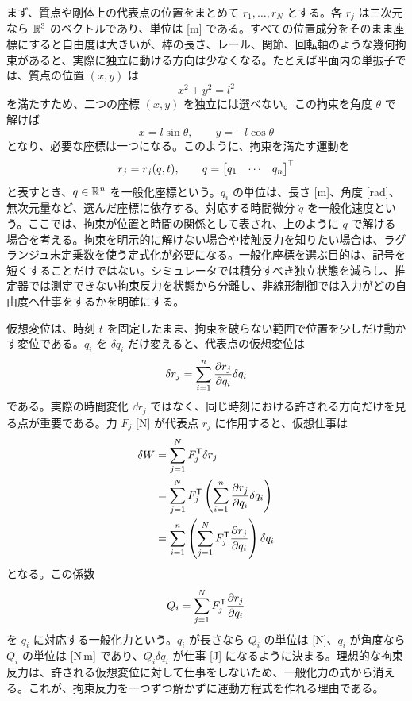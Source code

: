 まず、質点や剛体上の代表点の位置をまとめて $r_1,\ldots,r_N$ とする。各 $r_j$ は三次元なら $\mathbb{R}^3$ のベクトルであり、単位は [m] である。すべての位置成分をそのまま座標にすると自由度は大きいが、棒の長さ、レール、関節、回転軸のような幾何拘束があると、実際に独立に動ける方向は少なくなる。たとえば平面内の単振子では、質点の位置 $(x,y)$ は
\begin{equation}
  x^2+y^2=l^2
\end{equation}
を満たすため、二つの座標 $(x,y)$ を独立には選べない。この拘束を角度 $\theta$ で解けば
\begin{equation}
  x=l\sin\theta,\qquad
  y=-l\cos\theta
\end{equation}
となり、必要な座標は一つになる。このように、拘束を満たす運動を
\begin{equation}
  r_j=r_j(q,t),\qquad
  q=
  \begin{bmatrix}
    q_1&\cdots&q_n
  \end{bmatrix}^{\mathsf{T}}
\end{equation}
と表すとき、$q\in\mathbb{R}^n$ を一般化座標という。$q_i$ の単位は、長さ [m]、角度 [rad]、無次元量など、選んだ座標に依存する。対応する時間微分 $\dot{q}$ を一般化速度という。ここでは、拘束が位置と時間の関係として表され、上のように $q$ で解ける場合を考える。拘束を明示的に解けない場合や接触反力を知りたい場合は、ラグランジュ未定乗数を使う定式化が必要になる。一般化座標を選ぶ目的は、記号を短くすることだけではない。シミュレータでは積分すべき独立状態を減らし、推定器では測定できない拘束反力を状態から分離し、非線形制御では入力がどの自由度へ仕事をするかを明確にする。

仮想変位は、時刻 $t$ を固定したまま、拘束を破らない範囲で位置を少しだけ動かす変位である。$q_i$ を $\delta q_i$ だけ変えると、代表点の仮想変位は
\begin{equation}
  \delta r_j
  =
  \sum_{i=1}^n
  \frac{\partial r_j}{\partial q_i}\delta q_i
\end{equation}
である。実際の時間変化 $\dd r_j$ ではなく、同じ時刻における許される方向だけを見る点が重要である。力 $F_j$ [N] が代表点 $r_j$ に作用すると、仮想仕事は
\begin{align}
  \delta W
  &=
  \sum_{j=1}^N F_j^{\mathsf{T}}\delta r_j\\
  &=
  \sum_{j=1}^N
  F_j^{\mathsf{T}}
  \left(
    \sum_{i=1}^n
    \frac{\partial r_j}{\partial q_i}\delta q_i
  \right)\\
  &=
  \sum_{i=1}^n
  \left(
    \sum_{j=1}^N
    F_j^{\mathsf{T}}\frac{\partial r_j}{\partial q_i}
  \right)\delta q_i
\end{align}
となる。この係数
\begin{equation}
  Q_i=
  \sum_{j=1}^N
  F_j^{\mathsf{T}}\frac{\partial r_j}{\partial q_i}
\end{equation}
を $q_i$ に対応する一般化力という。$q_i$ が長さなら $Q_i$ の単位は [N]、$q_i$ が角度なら $Q_i$ の単位は [N\,m] であり、$Q_i\delta q_i$ が仕事 [J] になるように決まる。理想的な拘束反力は、許される仮想変位に対して仕事をしないため、一般化力の式から消える。これが、拘束反力を一つずつ解かずに運動方程式を作れる理由である。

